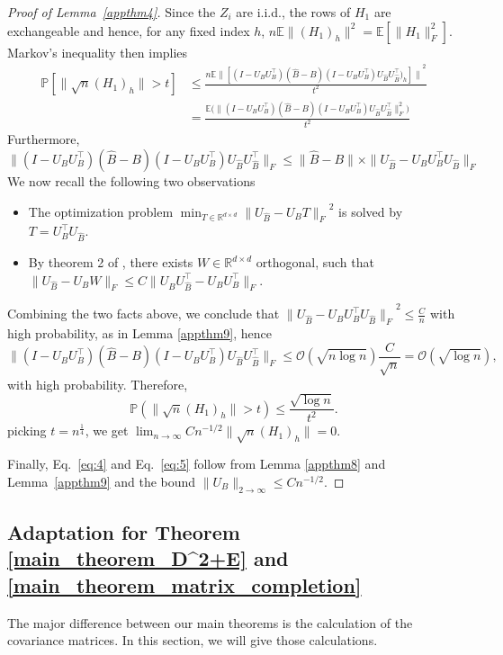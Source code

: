 \begin{proof}[Proof of Lemma~\ref{appthm4}]
Since the $Z_i$ are i.i.d., the rows of $H_1$ are exchangeable and hence, for any fixed index $h$, $n \mathbb{E} \|(H_1)_h \|^2 = \mathbb{E}[\|H_1\|_F^2]$. Markov's inequality then implies
  \begin{align*}
    \mathbb{P} [ \|\sqrt{n} (H_1)_h \| > t] & \leq \frac{n \mathbb{E} {\| [(I -U_B U_B^{\top}) (\hat{B} - B) (I -U_B U_B^{\top}) U_{\hat{B}} U_{\hat{B}}^\top)_h]\|}^2 }{t^2} \\
    & = \frac{\mathbb{E}\bigl(\| (I -U_B U_B^{\top}) (\hat{B} - B) (I -U_B U_B^{\top}) U_{\hat{B}} U_{\hat{B}}^{\top} \|_F^2\bigr)}{t^2}
  \end{align*}
  Furthermore,
  $$\| (I -U_B U_B^{\top}) (\hat{B} - B) (I -U_B U_B^{\top}) U_{\hat{B}} U_{\hat{B}}^{\top} \|_F \leq \| \hat{B} - B \| \times \|U_{\hat{B}} -U_B U_B^{\top} U_{\hat{B}} \|_F $$
  We now recall the following two observations
  \begin{itemize}
    \item The optimization problem $\min_{T \in \mathbb{R}^{d \times d}} {\| U_{\hat{B}} - U_B T\|_F}^2$ is solved by $T = U_B^{\top} U_{\hat{B}}.$
    \item By theorem 2 of \cite{vD-K}, there exists $W \in \mathbb{R}^{d \times d}$ orthogonal, such that $\| U_{\hat{B}} - U_B W\|_F \leq  
    C \| {U_{\hat{B}}} U_{\hat{B}}^{\top} - U_B U_B^{\top} \|_F.$
  \end{itemize}
  Combining the two facts above, we conclude that
   ${\| U_{\hat{B}} - U_B U_B^{\top} U_{\hat{B}} \|_F}^2  \leq \frac{C}{n}$ with high probability, as in Lemma \ref{appthm9}, hence 
  $$\| (I -U_B U_B^{\top}) (\hat{B} - B) (I -U_B U_B^{\top}) U_{\hat{B}} U_{\hat{B}}^{\top} \|_F \leq \mathcal{O}(\sqrt{n \log n}) \frac{C}{\sqrt{n}} = \mathcal{O}(\sqrt{\log n}),$$
  with high probability. Therefore,
  $$\mathbb{P} (\|\sqrt{n} (H_1)_h \| > t) \leq \frac{\sqrt{\log n}}{t^2}.$$
  picking $t=n^{\frac{1}{4}}$, we get $\lim_{n \rightarrow \infty} Cn^{-1/2} \|\sqrt{n} (H_1)_h\| = 0.$

Finally, Eq.~\eqref{eq:4} and Eq.~\eqref{eq:5} follow from Lemma \ref{appthm8} and Lemma~\ref{appthm9} and the bound $\| U_B\|_{2 \to \infty} \leq C n^{-1/2}$.
\end{proof}  

\subsection{Adaptation for Theorem \ref{main_theorem_D^2+E} and \ref{main_theorem_matrix_completion}}
The major difference between our main theorems is the calculation of the covariance matrices. In this section, we will give those calculations.


